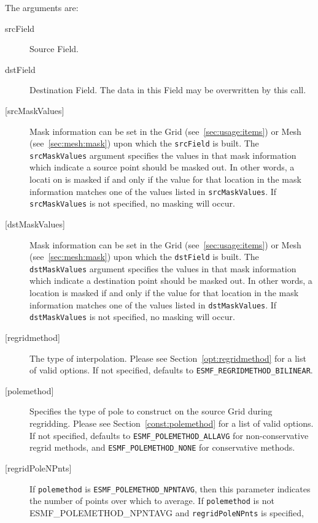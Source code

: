        The arguments are:
       \begin{description}
       \item [srcField]
             Source Field.
       \item [dstField]
             Destination Field. The data in this Field may be overwritten by this call. 
       \item [{[srcMaskValues]}]
             Mask information can be set in the Grid (see~\ref{sec:usage:items}) or Mesh (see~\ref{sec:mesh:mask}) 
             upon which the {\tt srcField} is built. The {\tt srcMaskValues} argument specifies the values in that 
             mask information which indicate a source point should be masked out. In other words, a locati on is masked if and only if the
             value for that location in the mask information matches one of the values listed in {\tt srcMaskValues}.  
             If {\tt srcMaskValues} is not specified, no masking will occur. 
       \item [{[dstMaskValues]}]
             Mask information can be set in the Grid (see~\ref{sec:usage:items}) or Mesh (see~\ref{sec:mesh:mask}) 
             upon which the {\tt dstField} is built. The {\tt dstMaskValues} argument specifies the values in that 
             mask information which indicate a destination point should be masked out. In other words, a location is masked if and only if the
             value for that location in the mask information matches one of the values listed in {\tt dstMaskValues}.  
             If {\tt dstMaskValues} is not specified, no masking will occur. 
       \item [{[regridmethod]}]
             The type of interpolation. Please see Section~\ref{opt:regridmethod} 
             for a list of valid options. If not specified, defaults to 
             {\tt ESMF\_REGRIDMETHOD\_BILINEAR}.
       \item [{[polemethod]}]
             Specifies the type of pole
             to construct on the source Grid during regridding. Please see 
             Section~\ref{const:polemethod} for a list of
             valid options. If not specified, defaults to {\tt ESMF\_POLEMETHOD\_ALLAVG} for non-conservative regrid methods, 
             and {\tt ESMF\_POLEMETHOD\_NONE} for conservative methods.
       \item [{[regridPoleNPnts]}]
             If {\tt polemethod} is {\tt ESMF\_POLEMETHOD\_NPNTAVG},
             then this parameter indicates the number of points over which to average.
             If {\tt polemethod} is not {ESMF\_POLEMETHOD\_NPNTAVG} and {\tt regridPoleNPnts} is specified, 

\end{description}
